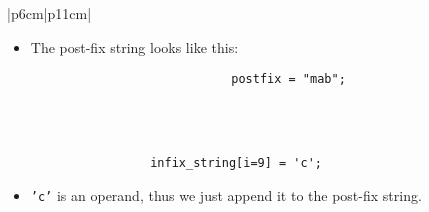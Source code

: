 \begin{center}
\begin{longtable}{ |p{6cm}|p{11cm}| }
\begin{itemize}
                \item The post-fix string looks like this: 
                    {
                        \begin{verbatim}
                            postfix = "mab";
                        \end{verbatim}
                    }
            \end{itemize}
            \\
        \hline
        \hline
             \\
        \hline
        \hline
            {
                \begin{verbatim}
                    infix_string[i=9] = 'c';
                \end{verbatim}
            }
            \begin{itemize}
                \item \texttt{'c'} is an operand, thus we just append it to the post-fix string.
            \end{itemize}

\end{longtable}
\end{center}
